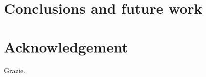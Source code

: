 \documentclass[12pt,twoside]{report}
\renewcommand{\chaptermark}[1]{\markboth{\thechapter.\ #1}{}}
\begin{document}



\clearpage{\pagestyle{empty}\cleardoublepage}

\clearpage{\pagestyle{empty}\cleardoublepage}

\clearpage{\pagestyle{empty}\cleardoublepage}

\clearpage{\pagestyle{empty}\cleardoublepage}
%
%
%
%


\clearpage{\pagestyle{empty}\cleardoublepage}
\chapter*{Conclusions and future work}
%




\printbibliography 
\clearpage{\pagestyle{empty}\cleardoublepage}
\chapter*{Acknowledgement}
Grazie.
\end{document}
